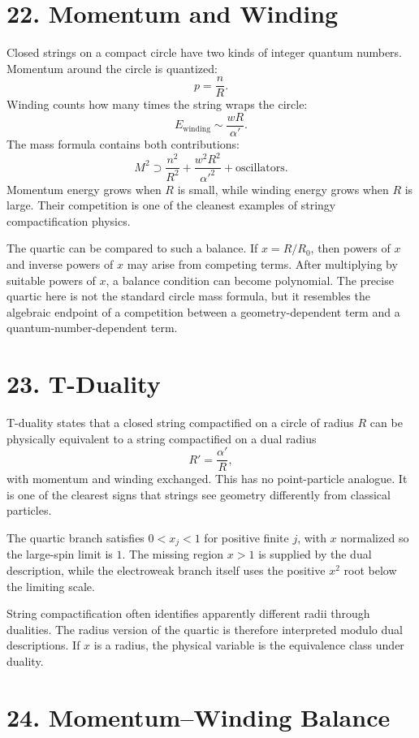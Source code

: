 \documentclass[11pt]{article}
\begin{document}
\section*{22. Momentum and Winding}

Closed strings on a compact circle have two kinds of integer quantum numbers. Momentum around the circle is quantized:
\[
        p=\frac{n}{R}.
\]
Winding counts how many times the string wraps the circle:
\[
        E_{\text{winding}}\sim \frac{wR}{\alpha'} .
\]
The mass formula contains both contributions:
\[
        M^2\supset \frac{n^2}{R^2}+\frac{w^2R^2}{\alpha'^2}
        +\text{oscillators}.
\]
Momentum energy grows when \(R\) is small, while winding energy grows when \(R\) is large. Their competition is one of the cleanest examples of stringy compactification physics.

The quartic can be compared to such a balance. If \(x=R/R_0\), then powers of \(x\) and inverse powers of \(x\) may arise from competing terms. After multiplying by suitable powers of \(x\), a balance condition can become polynomial. The precise quartic here is not the standard circle mass formula, but it resembles the algebraic endpoint of a competition between a geometry-dependent term and a quantum-number-dependent term.


\section*{23. T-Duality}

T-duality states that a closed string compactified on a circle of radius \(R\) can be physically equivalent to a string compactified on a dual radius
\[
        R'=\frac{\alpha'}{R},
\]
with momentum and winding exchanged. This has no point-particle analogue. It is one of the clearest signs that strings see geometry differently from classical particles.

The quartic branch satisfies \(0<x_j<1\) for positive finite \(j\), with \(x\) normalized so the large-spin limit is \(1\). The missing region \(x>1\) is supplied by the dual description, while the electroweak branch itself uses the positive \(x^2\) root below the limiting scale.

String compactification often identifies apparently different radii through dualities. The radius version of the quartic is therefore interpreted modulo dual descriptions. If \(x\) is a radius, the physical variable is the equivalence class under duality.


\section*{24. Momentum--Winding Balance}
\end{document}
